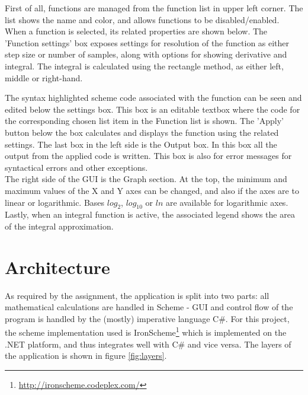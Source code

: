 \documentclass[a4paper,12pt]{article}
\begin{document}
First of all, functions are managed from the function list in upper left corner. The list shows the name and color, and allows functions to be disabled/enabled. When a function is selected, its related properties are shown below.
The 'Function settings' box exposes settings for resolution of the function as either step size or number of samples, along with options for showing derivative and integral. The integral is calculated using the rectangle method, as either left, middle or right-hand.

The syntax highlighted scheme code associated with the function can be seen and edited below the settings box. This box is an editable textbox where the code for the corresponding chosen list item in the Function list is shown. The 'Apply' button below the box calculates and displays the function using the related settings. 
The last box in the left side is the Output box. In this box all the output from the applied code is written. This box is also for error messages for syntactical errors and other exceptions.
\\

The right side of the GUI is the Graph section. At the top, the minimum and maximum values of the X and Y axes can be changed, and also if the axes are to linear or logarithmic. Bases $log_2$, $log_{10}$ or $ln$ are available for logarithmic axes. Lastly, when an integral function is active, the associated legend shows the area of the integral approximation.

\section{Architecture}

As required by the assignment, the application is split into two parts: all mathematical calculations are handled in Scheme -  GUI and control flow of the program is handled by the (mostly) imperative language C\#. For this project, the scheme implementation used is IronScheme\footnote{\url{http://ironscheme.codeplex.com/}} which is implemented on the .NET platform, and thus integrates well with C\# and vice versa. The layers of the application is shown in figure \ref{fig:layers}.
\end{document}
